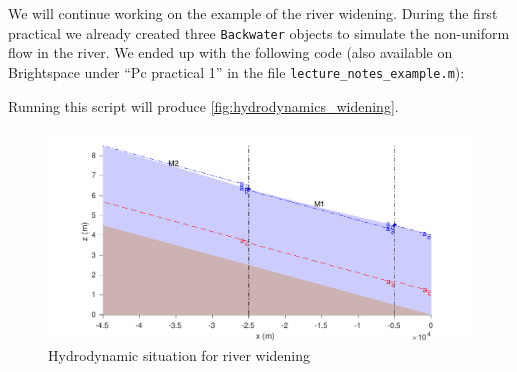\documentclass[a4paper]{article}
\begin{document}
We will continue working on the example of the river widening. During the first practical we already created three \lstinline{Backwater} objects to simulate the non-uniform flow in the river. We ended up with the following code (also available on Brightspace under ``Pc practical 1'' in the file \lstinline{lecture_notes_example.m}):

Running this script will produce \autoref{fig:hydrodynamics_widening}.
\begin{figure}[h]
  \centering
  \includegraphics[width=\linewidth]{matlab/backwater_lecture_notes.pdf}
  \caption{Hydrodynamic situation for river widening}
  \label{fig:hydrodynamics_widening}
\end{figure}
\end{document}
